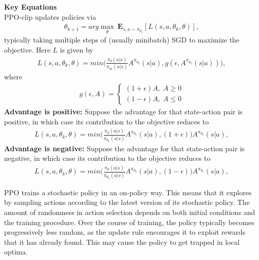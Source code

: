 \textbf{Key Equations} \\
PPO-clip updates policies via
\begin{align*}
    \theta_{k+1}=arg\max_\theta{\ \mathbf{E}_{s,a\sim\pi_{\theta_k}}}\left[L\left(s,a,\theta_k,\theta\right)\right],
\end{align*}
typically taking multiple steps of (usually minibatch) SGD to maximize the objective. Here $L$ is given by
\begin{align*}
    L\left(s,a,\theta_k,\theta\right)=min \Big(\frac{\pi_{\theta}(a|s)}{\pi_{\theta_k}(a|s)}A^{\pi_{\theta_k}}(s|a),g(\epsilon,A^{\pi_{\theta_k}}(s|a)) \Big) ,
\end{align*}
where 
\begin{align*}
    g(\epsilon,A)=\left\{
    \begin{aligned}
        (1+\epsilon)A,\; A\geq 0  \\
        (1-\epsilon)A,\; A\leq 0   
    \end{aligned}
\right.
\end{align*}
\textbf{Advantage is positive: }Suppose the advantage for that state-action pair is positive, in which case its contribution to the objective reduces to
\begin{align*}
    L\left(s,a,\theta_k,\theta\right)=min\Big(\frac{\pi_{\theta}(a|s)}{\pi_{\theta_k}(a|s)}A^{\pi_{\theta_k}}(s|a),(1+\epsilon)\Big)A^{\pi_{\theta_k}}(s|a) ,
\end{align*}
\textbf{Advantage is negative:} Suppose the advantage for that state-action pair is negative, in which case its contribution to the objective reduces to
\begin{align*}
    L\left(s,a,\theta_k,\theta\right)=min \Big(\frac{\pi_{\theta}(a|s)}{\pi_{\theta_k}(a|s)}A^{\pi_{\theta_k}}(s|a),(1-\epsilon)\Big)A^{\pi_{\theta_k}}(s|a) ,
\end{align*}

PPO trains a stochastic policy in an on-policy way. This means that it explores by sampling actions according to the latest version of its stochastic policy. The amount of randomness in action selection depends on both initial conditions and the training procedure. Over the course of training, the policy typically becomes progressively less random, as the update rule encourages it to exploit rewards that it has already found. This may cause the policy to get trapped in local optima.
